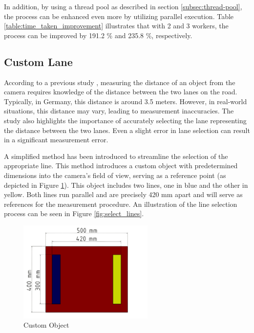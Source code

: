 In addition, by using a thread pool as described in section \ref{subsec:thread-pool}, the process can be enhanced even more by utilizing parallel execution. Table \ref{table:time_taken_improvement} illustrates that with 2 and 3 workers, the process can be improved by 191.2 \% and 235.8 \%, respectively.


\subsection{Custom Lane}
\label{subsec:custom_lane}
According to a previous study \cite{Sabtu_2023}, measuring the distance of an object from the camera requires knowledge of the distance between the two lanes on the road. Typically, in Germany, this distance is around 3.5 meters. However, in real-world situations, this distance may vary, leading to measurement inaccuracies. The study also highlights the importance of accurately selecting the lane representing the distance between the two lanes. Even a slight error in lane selection can result in a significant measurement error.

A simplified method has been introduced to streamline the selection of the appropriate line. This method introduces a custom object with predetermined dimensions into the camera's field of view, serving as a reference point (as depicted in Figure \ref{fig:custom_object}). This object includes two lines, one in blue and the other in yellow. Both lines run parallel and are precisely 420 mm apart and will serve as references for the measurement procedure. An illustration of the line selection process can be seen in Figure \ref{fig:select_lines}.

\begin{figure}[!ht]
    \centering
    \includegraphics[width=0.6\textwidth]{texs/Part2/chapter4/image/matdimension.png}
    \caption{Custom Object}
    \label{fig:custom_object}
\end{figure}

